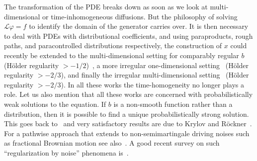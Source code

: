 \documentclass[a4paper,11pt]{article}
\newcommand{\LL}{\mathcal{L}}
\newcommand{\1}{\mathds{1}}
\begin{document}
The transformation of the PDE breaks down as soon as we look at multi-dimensional or time-inhomogeneous diffusions. But the philosophy of solving $\LL \varphi = f$ to identify the domain of the generator carries over. It is then necessary to deal with PDEs with distributional coefficients, and using paraproducts, rough paths, and paracontrolled distributions respectively, the construction of $x$ could recently be extended to the multi-dimensional setting for comparably regular $b$ (H\"older regularity $> -1/2$)~\cite{FIR17}, a more irregular one-dimensional setting~\cite{DD16} (H\"older regularity $>-2/3$), and finally the irregular multi-dimensional setting~\cite{CC15} (H\"older regularity $>-2/3$). In all these works the time-homogeneity no longer plays a role. Let us also mention that all these works are concerned with probabilistically weak solutions to the equation. If $b$ is a non-smooth function rather than a distribution, then it is possible to find a unique probabilistically strong solution. This goes back to~\cite{Z74, V80} and very satisfactory results are due to Krylov and R\"ockner~\cite{KR05}. For a pathwise approach that extends to non-semimartingale driving noises such as fractional Brownian motion see also~\cite{CG15}. A good recent survey on such ``regularization by noise'' phenomena is~\cite{F10}.
\end{document}
